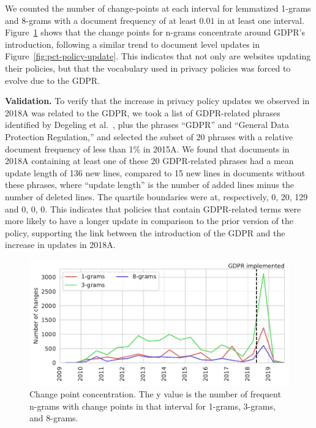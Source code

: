 We counted the number of change-points at each interval for lemmatized 1-grams and 8-grams with a document frequency of at least $0.01$ in at least one interval.
Figure~\ref{fig:changepoints} shows that the change points for n-grams concentrate around GDPR's introduction, following a similar trend to document level updates in Figure~\ref{fig:pct-policy-update}. This indicates that not only are websites updating their policies, but that the vocabulary used in privacy policies was forced to evolve due to the GDPR.


\textbf{Validation.} To verify that the increase in privacy policy updates we observed in 2018A was related to the GDPR, we took a list of GDPR-related phrases identified by Degeling et al.~\cite{degeling2018we}, plus the phrases “GDPR” and “General Data Protection Regulation,” and selected the subset of 20 phrases with a relative document frequency of less than 1\% in 2015A. We found that documents in 2018A containing at least one of these 20 GDPR-related phrases had a mean update length of 136 new lines, compared to 15 new lines in documents without these phrases, where “update length” is the number of added lines minus the number of deleted lines. The quartile boundaries were at, respectively, 0, 20, 129 and 0, 0, 0. This indicates that policies that contain GDPR-related terms were more likely to have a longer update in comparison to the prior version of the policy, supporting the link between the introduction of the GDPR and the increase in updates in 2018A.

\begin{figure}
    \centering
    \includegraphics[width=.9\textwidth]{chapters/privacypolicies/figures/changepoints.pdf}
    \caption[Change point concentration]{Change point concentration. The y value is the number of frequent n-grams with change points in that interval for 1-grams, 3-grams, and 8-grams.}
    
    \label{fig:changepoints}
\end{figure}
